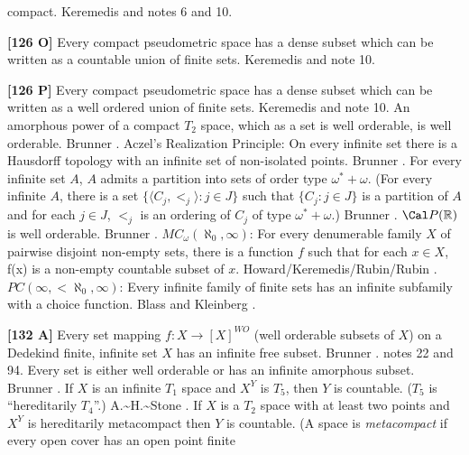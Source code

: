 compact.  \ac{Keremedis} \cite{1999a} and notes 6 and 10.
\smallskip
\item{}{\bf [126 O]} Every compact pseudometric space has a dense
subset which can be written as a countable union of finite sets.
\ac{Keremedis} \cite{1999a} and note 10.
\smallskip
\item{}{\bf [126 P]} Every compact pseudometric space has a dense
subset which can be written as a well ordered union of finite
sets.  \ac{Keremedis} \cite{1999a} and note 10.
\medskip
{} An amorphous power of a compact $T_2$ space, which
as a set is well orderable, is well orderable.  \ac{Brunner} \cite{1984b}.
\medskip
{} Aczel's Realization Principle: On every infinite
set there is a Hausdorff topology with an infinite set of non-isolated
points.  \ac{Brunner} \cite{1984f}. 
\medskip
{} For every infinite set $A$, $A$ admits a partition
into sets of order type $\omega^{*} + \omega$. (For every infinite $A$,
there is a set $\{\langle C_j,<_j \rangle: j\in J\}$ such that
$\{C_j: j\in J\}$ is a partition of $A$ and for each $j\in J$, $<_j$
is an ordering of $C_j$ of type $\omega^* + \omega$.)  \ac{Brunner}
\cite{1984f}.
\medskip
{} ${\Cal P}(\Bbb R)$ is well orderable. \ac{Brunner}
\cite{1984f}.
\medskip
{} $MC_\omega(\aleph_0,\infty)$: For every
denumerable family $X$ of pairwise disjoint non-empty sets, there is a
function $f$ such that for each $x\in X$, f(x) is a non-empty countable
subset of $x$. \ac{Howard/Keremedis/Rubin/Rubin} \cite{1998b}.
\medskip
{} $PC(\infty, <\aleph_0,\infty)$:  Every infinite
family of finite  sets has an infinite subfamily with a choice
function.  \ac{Blass} \cite{1977a} and \ac{Kleinberg} \cite{1969}.
\smallskip
\item{}{\bf [132 A]}  Every set mapping $f: X\rightarrow [X]^{WO}$ (well
orderable subsets of $X$) on a Dedekind finite, infinite set $X$ has
an infinite free subset.  \ac{Brunner} \cite{1989}. notes 22 and 94.
\medskip
{} Every set is either well orderable or has an
infinite amorphous subset.  \ac{Brunner} \cite{1982a}.
\medskip
{} If $X$ is an infinite $T_1$ space and $X^{Y}$
is $T_5$, then $Y$ is countable. ($T_5$ is ``hereditarily $T_4$''.)
\ac{A.~H.~Stone} \cite{1948}.
\medskip
{} If $X$ is a $T_2$ space with at least two points
and $X^{Y}$ is hereditarily metacompact then $Y$ is  countable. (A space
is {\it metacompact} if every open cover has an open point finite

